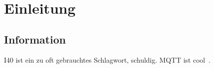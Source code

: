 \chapter{Einleitung}
\label{cEinleitung}

\section{Information}
\label{sInformation}
\ac{I40} ist ein zu oft gebrauchtes Schlagwort, schuldig. \ac{MQTT} ist cool~\cite{Stanford-Clark}.